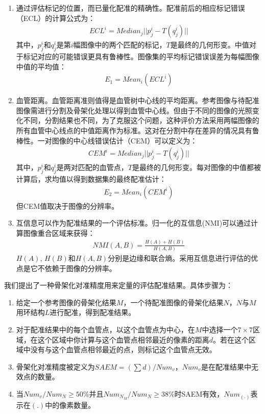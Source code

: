\begin{enumerate}
\item 通过评估标记的位置，而已量化配准的精确性。配准前后的相应标记错误（ECL）的计算公式为：
\begin{align}
ECL^i = Median_{j}||p_j^i - T(q_j^i)|| 
\end{align}
其中，$p_j^i$和$q_j^i$是第$i$幅图像中的两个匹配的标记，$T$是最终的几何形变。中值对于标记对应的可能错误更具有鲁棒性。图像集的平均标记错误误差为每幅图像中值的平均值：
\begin{align}
E_1 = Mean_i(ECL^i)
\end{align}
\item 血管距离。血管距离准则值得是血管树中心线的平均距离。参考图像与待配准图像需进行分割及骨架化处理以得到血管中心线。但由于不同的图像的光照变化不同，分割结果也不同，为了克服这个问题，这种评价方法采用两幅图像的所有血管中心线点的中值距离作为标准。这对在分割中存在差异的情况具有鲁棒性。一对图像的中心线错误估计（CEM）可以定义为：
\begin{align}
CEM^i  = Median_j||p_j^i - T(q_j^i)||
\end{align}
其中，$p_j^i$和$q_j^i$是两对匹配的血管点，$T$是最终的几何形变。每对图像的中值都被计算后，求均值以得到数据集的最终配准估计：
\begin{align}
E_2 = Mean_i(CEM^i)
\end{align}
但CEM值取决于图像的分辨率。
\item 互信息可以作为配准结果的一个评估标准。归一化的互信息(NMI)可以通过计算图像重合区域来获得：
\begin{align}
NMI(A, B) = \frac{H(A)+H(B)}{H(A, B)}
\end{align}
$H(A)$, $H(B)$和$H(A,B)$分别是边缘和联合熵。采用互信息进行评估的优点是它不依赖于图像的分辨率。
\end{enumerate}



我们提出了一种骨架化对准精度用来定量的评估配准结果。具体步骤为：
\begin{enumerate}
\item 给定一个参考图像的骨架化结果$M$，一个待配准图像的骨架化结果$N$，$N$与$M$用环结构$L$进行配准，得到配准结果。
\item 对于配准结果中的每个血管点，以这个血管点为中心，在$M$中选择一个$7 \times 7$区域，在这个区域中你计算与这个血管点相邻最近的像素的距离$d$。若在这个区域中没有与这个血管点相邻最近的点，则标记这个血管点无效。
\item 骨架化对准精度被定义为$SAEM = (\sum d) / Num_v$，$Num_v$是在配准结果中无效点的数量。
\item 当$Num_v / Num_{N} \geq 50 \%$并且$Num_{N_{M}} / Num_{N} \geq 38 \%$时SAEM有效，$Num_{(.)}$表示在$(.)$中的像素数量。
\end{enumerate}

